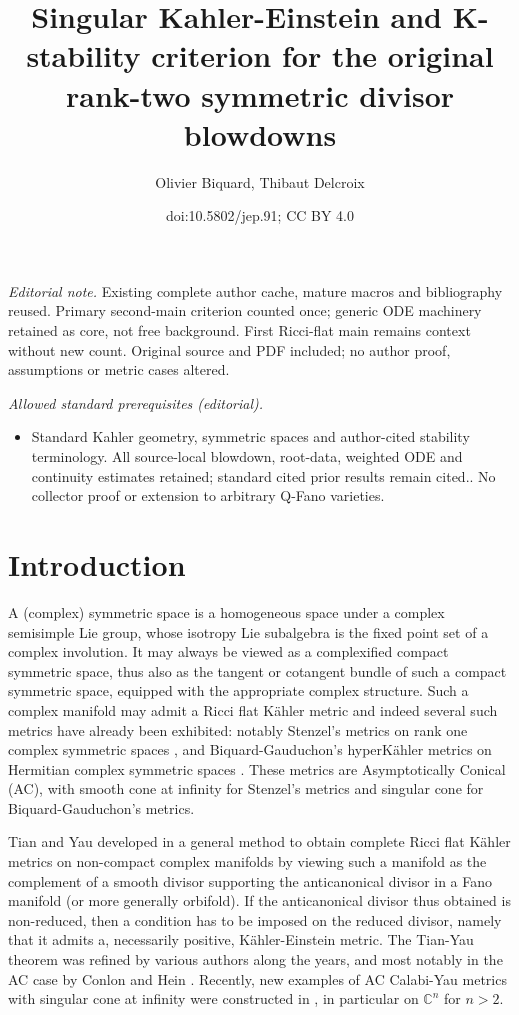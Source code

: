 \documentclass[10pt]{amsart}
\title{Singular Kahler-Einstein and K-stability criterion for the original rank-two symmetric divisor blowdowns}
\author{Olivier Biquard, Thibaut Delcroix}
\date{doi:10.5802/jep.91; CC BY 4.0}
\theoremstyle{plain}
\theoremstyle{definition}
\providecommand{\mainmatter}{}\providecommand{\backmatter}{}
\begin{document}
\maketitle
\noindent\textit{Editorial note.} Existing complete author cache, mature macros and bibliography reused. Primary second-main criterion counted once; generic ODE machinery retained as core, not free background. First Ricci-flat main remains context without new count. Original source and PDF included; no author proof, assumptions or metric cases altered.\par\medskip
\noindent\textit{Allowed standard prerequisites (editorial).}\begin{itemize}
\item Standard Kahler geometry, symmetric spaces and author-cited stability terminology. All source-local blowdown, root-data, weighted ODE and continuity estimates retained; standard cited prior results remain cited.. No collector proof or extension to arbitrary Q-Fano varieties.
\end{itemize}\medskip
\vspace*{-\baselineskip}%
\tableofcontents
\mainmatter

\section{Introduction}

A (complex) symmetric space is a homogeneous space under a complex
semisimple Lie group, whose isotropy Lie subalgebra is the fixed point
set of a complex involution. It may always be viewed as a
complexified compact symmetric space, thus also as the tangent or
cotangent bundle of such a compact symmetric space, equipped with the
appropriate complex structure. Such a complex manifold may admit a
Ricci flat Kähler metric and indeed several such metrics have already
been exhibited: notably Stenzel's metrics on rank one complex
symmetric spaces \cite{Ste93}, and Biquard-Gauduchon's hyperKähler
metrics on Hermitian complex symmetric spaces \cite{BG96}. These metrics are Asymptotically Conical (AC), with smooth cone at infinity for Stenzel's metrics and singular cone for Biquard-Gauduchon's metrics.

Tian and Yau developed in \cite{TiaYau90,TiaYau91} a general method
to obtain complete Ricci flat Kähler metrics on non-compact complex
manifolds by viewing such a manifold as the complement of a smooth
divisor supporting the anticanonical divisor in a Fano manifold (or
more generally orbifold). If the anticanonical divisor thus obtained
is non-reduced, then a condition has to be imposed on the reduced
divisor, namely that it admits a, necessarily positive,
Kähler-Einstein metric. The Tian-Yau theorem was refined by various authors along the years, and most notably in the AC case by Conlon and Hein \cite{ConHei13,ConHei15}. Recently, new examples of AC Calabi-Yau metrics with singular cone at infinity were constructed in \cite{CDR16,Li17,Sze17}, in particular on $\mathbb{C}^n$ for $n>2$.
\end{document}
